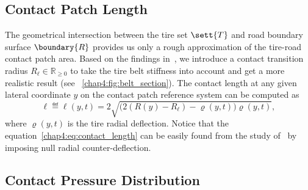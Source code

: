 \subsection{Contact Patch Length}
\label{chap4:sec:contact_patch}

The geometrical intersection between the tire set $\sett{T}$ and road boundary surface $\boundary{R}$ provides us only a rough approximation of the tire-road contact patch area. Based on the findings in~\cite{koutny2007geometry, rhyne2005development}, we introduce a contact transition radius $R_\ell \in \mathbb{R}_{\geq 0}$ to take the tire belt stiffness into account and get a more realistic result (see \figurename~\ref{chap4:fig:belt_section}). The contact length at any given lateral coordinate $y$ on the contact patch reference system can be computed as
%
\begin{equation}
  \ell \eqdef \ell(y,t) = 2\sqrt{\big(2(R(y)-R_\ell) - \varrho(y,t)\big)\varrho(y,t)},
  \label{chap4:eq:contact_length}
\end{equation}
%
where $\varrho(y,t)$ is the tire radial deflection. Notice that the equation~\eqref{chap4:eq:contact_length} can be easily found from the study of~\citet{rhyne2005development} by imposing null radial counter-deflection.

\subsection{Contact Pressure Distribution}
\label{chap4:sec:pressure_distribution}

